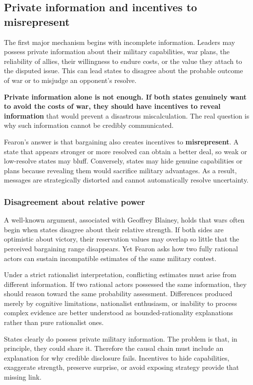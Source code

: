 \subsection{Private information and incentives to misrepresent}

The first major mechanism begins with incomplete information. Leaders may possess private information about their military capabilities, war plans, the reliability of allies, their willingness to endure costs, or the value they attach to the disputed issue. This can lead states to disagree about the probable outcome of war or to misjudge an opponent's resolve.

\textbf{Private information alone is not enough. If both states genuinely want to avoid the costs of war, they should have incentives to reveal information} that would prevent a disastrous miscalculation. The real question is why such information cannot be credibly communicated.

Fearon's answer is that bargaining also creates incentives to \textbf{misrepresent}. A state that appears stronger or more resolved can obtain a better deal, so weak or low-resolve states may bluff. Conversely, states may hide genuine capabilities or plans because revealing them would sacrifice military advantages. As a result, messages are strategically distorted and cannot automatically resolve uncertainty.

\subsubsection{Disagreement about relative power}

A well-known argument, associated with Geoffrey Blainey, holds that wars often begin when states disagree about their relative strength. If both sides are optimistic about victory, their reservation values may overlap so little that the perceived bargaining range disappears. Yet Fearon asks how two fully rational actors can sustain incompatible estimates of the same military contest.

Under a strict rationalist interpretation, conflicting estimates must arise from different information. If two rational actors possessed the same information, they should reason toward the same probability assessment. Differences produced merely by cognitive limitations, nationalist enthusiasm, or inability to process complex evidence are better understood as bounded-rationality explanations rather than pure rationalist ones.

States clearly do possess private military information. The problem is that, in principle, they could share it. Therefore the causal chain must include an explanation for why credible disclosure fails. Incentives to hide capabilities, exaggerate strength, preserve surprise, or avoid exposing strategy provide that missing link.

